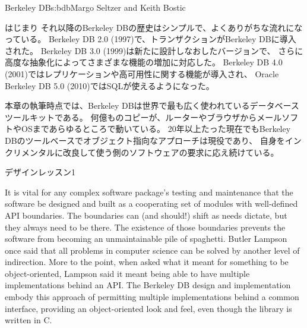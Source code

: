 \begin{aosachapter}{Berkeley DB}{s:bdb}{Margo Seltzer and Keith Bostic}
\begin{aosasect1}{はじまり}
それ以降のBerkeley DBの歴史はシンプルで、よくありがちな流れになっている。
Berkeley DB 2.0 (1997)で、トランザクションがBerkeley DBに導入された。
Berkeley DB 3.0 (1999)は新たに設計しなおしたバージョンで、
さらに高度な抽象化によってさまざまな機能の増加に対応した。
Berkeley DB 4.0 (2001)ではレプリケーションや高可用性に関する機能が導入され、
Oracle Berkeley DB 5.0 (2010)ではSQLが使えるようになった。

本章の執筆時点では、Berkeley DBは世界で最も広く使われているデータベースツールキットである。
何億ものコピーが、ルーターやブラウザからメールソフトやOSまであらゆるところで動いている。
20年以上たった現在でもBerkeley DBのツールベースでオブジェクト指向なアプローチは現役であり、
自身をインクリメンタルに改良して使う側のソフトウェアの要求に応え続けている。

\begin{aosabox}{デザインレッスン1}

It is vital for any complex software package's testing and maintenance
that the software be designed and built as a cooperating set of
modules with well-defined API boundaries. The boundaries can (and
should!) shift as needs dictate, but they always need to be there.
The existence of those boundaries prevents the software from becoming
an unmaintainable pile of spaghetti. Butler Lampson once said that all
problems in computer science can be solved by another level of
indirection. More to the point, when asked what it meant for something
to be object-oriented, Lampson said it meant being able to have
multiple implementations behind an API\@. The Berkeley DB design and
implementation embody this approach of permitting multiple
implementations behind a common interface, providing an
object-oriented look and feel, even though the library is written in
C.


\end{aosabox}
\end{aosasect1}
\end{aosachapter}
